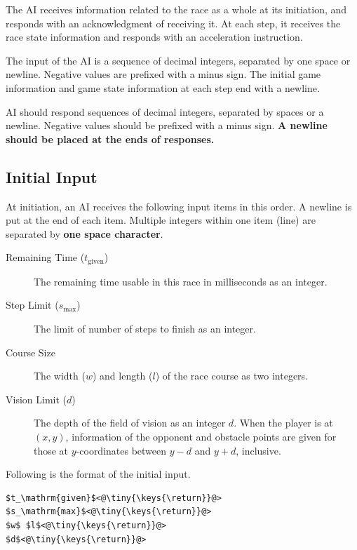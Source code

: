 \documentclass[11pt]{article}
\begin{document}
The AI receives information related to the race as a whole at its
initiation, and responds with an acknowledgment of receiving it.  At
each step, it receives the race state information and responds with an
acceleration instruction.

The input of the AI is a sequence of decimal integers, separated by
one space or newline.  Negative values are prefixed with a minus
sign.  The initial game information and game state information at each
step end with a newline.

AI should respond sequences of decimal integers, separated by
spaces or a newline.  Negative values should be prefixed with a minus
sign.  {\bf A newline should be placed at the ends of responses.}

\subsection{Initial Input}
At initiation, an AI receives the following input items in this order.
A newline is put at the end of each item. Multiple integers within one item (line) are separated by {\bf one space character}.
\begin{description}
\item[Remaining Time ($t_\mathrm{given}$)] The remaining time usable in this race in
  milliseconds as an integer.
\item[Step Limit ($s_\mathrm{max}$)] The limit of number of steps to finish as an integer.
\item[Course Size] The width ($w$) and length ($l$) of the race course as two integers.
\item[Vision Limit ($d$)] The depth of the field of vision as an integer
  $d$. When the player is at $(x, y)$, information of the opponent and
  obstacle points are given for those at $y$-coordinates between $y-d$
  and $y+d$, inclusive.
\end{description}

\makeatletter
\def\lst@visiblespace{$\color{Gray}{}_{
  \mbox{\kern.06em\vrule \@height.3ex}%
  \vbox{\hrule \@width.3em}%
  \hbox{\vrule \@height.3ex}}$}
\makeatother


\noindent
Following is the format of the initial input.

\begin{lstlisting}
$t_\mathrm{given}$<@\tiny{\keys{\return}}@>
$s_\mathrm{max}$<@\tiny{\keys{\return}}@>
$w$ $l$<@\tiny{\keys{\return}}@>
$d$<@\tiny{\keys{\return}}@>
\end{lstlisting}
\end{document}

